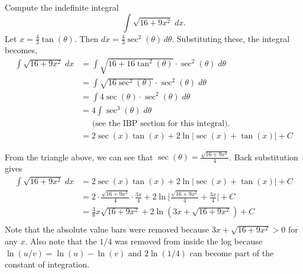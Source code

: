 \documentclass{ximera}
\begin{document}
\begin{example}
Compute the indefinite integral
\[
\int \sqrt{16 + 9x^2} \; dx.
\]
Let $x = \frac43 \tan(\theta)$. Then $dx = \frac43 \sec^2(\theta) \, d\theta$.
Substituting these, the integral becomes,
\begin{align*}
\int \sqrt{16 + 9x^2} \; dx &= \int \sqrt{16+16\tan^2(\theta)} \cdot \sec^2(\theta) \; d\theta\\
                            &= \int \sqrt{16\sec^2(\theta)} \cdot \sec^2(\theta) \; d\theta\\
                            &= \int 4\sec(\theta) \cdot \sec^2(\theta) \; d\theta\\
                            &= 4\int \sec^3(\theta) \; d\theta\\
                            &\;\;\;\;\;\text{(see the IBP section for this integral).}\\
                            &= 2 \sec(x) \tan(x) + 2 \ln|\sec(x) + \tan(x)| + C
\end{align*}
                            

From the triangle above, we can see that $\sec(\theta) = \frac{\sqrt{16+9x^2}}{4 }$. Back substitution gives
\begin{align*}
\int \sqrt{16 + 9x^2} \; dx &= 2 \sec(x) \tan(x) + 2 \ln|\sec(x) + \tan(x)| + C\\
                            &=  2 \cdot\frac{\sqrt{16+9x^2}}{4 } \cdot \frac{3x}{4}  + 2 \ln\bigg|\frac{\sqrt{16+9x^2}}{4 } + \frac{3x}{4}\bigg| + C\\
                            &=   \frac38 x\sqrt{16+9x^2}  + 2 \ln\left(3x +  \sqrt{16+9x^2}\right) + C\\
\end{align*}
Note that the absolute value bars were removed because $3x +  \sqrt{16+9x^2} > 0$ for any $x$. Also note that the $1/4$ was removed from inside the log 
because $\ln(u/v) = \ln(u) - \ln(v)$ and $2\ln(1/4)$ can become part of the constant of integration.
\end{example}
\end{document}
